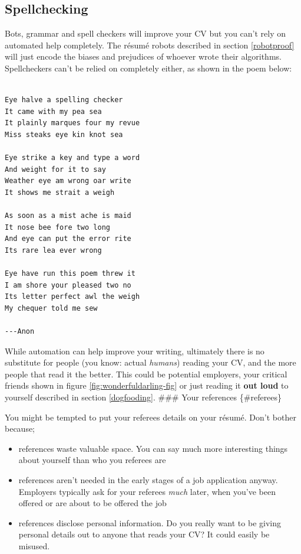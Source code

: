 \documentclass[
]{book}
\providecommand{\tightlist}{%
  \setlength{\itemsep}{0pt}\setlength{\parskip}{0pt}}
\begin{document}
\hypertarget{spelling}{%
\subsection{Spellchecking}\label{spelling}}

Bots, grammar and spell checkers will improve your CV but you can't rely on automated help completely. The résumé robots described in section \ref{robotproof} will just encode the biases and prejudices of whoever wrote their algorithms. Spellcheckers can't be relied on completely either, as shown in the poem below:

\begin{verbatim}

Eye halve a spelling checker
It came with my pea sea
It plainly marques four my revue
Miss steaks eye kin knot sea

Eye strike a key and type a word
And weight for it to say
Weather eye am wrong oar write
It shows me strait a weigh

As soon as a mist ache is maid
It nose bee fore two long
And eye can put the error rite
Its rare lea ever wrong

Eye have run this poem threw it
I am shore your pleased two no
Its letter perfect awl the weigh
My chequer told me sew

---Anon
\end{verbatim}

While automation can help improve your writing, ultimately there is no substitute for people (you know: actual \emph{humans}) reading your CV, and the more people that read it the better. This could be potential employers, your critical friends shown in figure \ref{fig:wonderfuldarling-fig} or just reading it \textbf{out loud} to yourself described in section \ref{dogfooding}.
\#\#\# Your references \{\#referees\}

You might be tempted to put your referees details on your résumé. Don't bother because;

\begin{itemize}
\tightlist
\item
  references waste valuable space. You can say much more interesting things about yourself than who you referees are
\item
  references aren't needed in the early stages of a job application anyway. Employers typically ask for your referees \emph{much} later, when you've been offered or are about to be offered the job
\item
  references disclose personal information. Do you really want to be giving personal details out to anyone that reads your CV? It could easily be misused.
\end{itemize}
\end{document}
